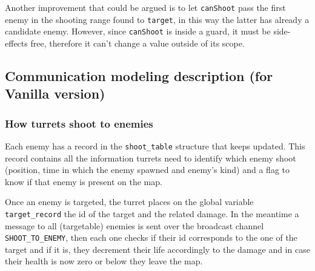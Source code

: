 \documentclass[
10pt, %
a4paper, %
oneside, %
headinclude,footinclude, %
BCOR5mm, %
]{scrartcl}
\begin{document}
				Another improvement that could be argued is to let \texttt{canShoot} pass the first enemy in the shooting range found to \texttt{target}, in this way the latter has already a candidate enemy. However, since \texttt{canShoot} is inside a guard, it must be side-effects free, therefore it can't change a value outside of its scope.
		\subsection{Communication modeling description (for Vanilla version)}
			\subsubsection{How turrets shoot to enemies}
				Each enemy has a record in the \texttt{shoot\_table} structure that keeps updated. This record contains all the information turrets need to identify which enemy shoot (position, time in which the enemy spawned and enemy's kind) and a flag to know if that enemy is present on the map.
				
				Once an enemy is targeted, the turret places on the global variable \texttt{target\_record} the id of the target and the related damage. In the meantime a message to all (targetable) enemies is sent over the broadcast channel \texttt{SHOOT\_TO\_ENEMY}, then each one checks if their id corresponds to the one of the target and if it is, they decrement their life accordingly to the damage and in case their health is now zero or below they leave the map.
				
\end{document}
